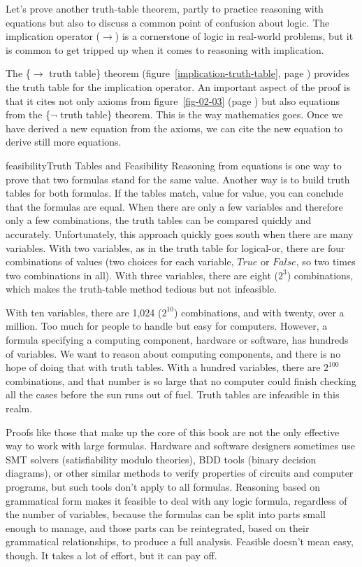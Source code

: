 Let's prove another truth-table theorem, partly to practice
reasoning with equations but also to discuss a common
point of confusion about logic. The implication operator
($\rightarrow$) is a cornerstone of logic in real-world problems,
but it is common to get tripped up when it comes to
reasoning with implication.

The \{$\rightarrow$ truth table\} theorem
(figure~\ref{implication-truth-table}, page \pageref{implication-truth-table})
provides the truth table
for the implication operator.
An important aspect of the proof is that it cites
not only axioms from figure~\ref{fig-02-03} (page \pageref{fig-02-03})
but also equations from the \{$\neg$ truth table\} theorem.
This is the way mathematics goes. Once we have derived
a new equation from the axioms, we can cite
the new equation to derive still more equations.

\begin{aside}{feasibility}{Truth Tables and Feasibility}
Reasoning from equations is one way to prove that two formulas stand
for the same value.
Another way is to build truth tables for both formulas.
If the tables match, value for value, you can conclude that
the formulas are equal.
When there are only a few variables and therefore only a few combinations,
the truth tables can be compared quickly and accurately.
Unfortunately, this approach quickly goes south when there are many variables.
With two variables, as in the truth table
for logical-or, there are four combinations of values
(two choices for each variable, $True$ or $False$, so two times two
combinations in all). With three variables, there are eight
($2^3$) combinations, which makes the truth-table method tedious
but not infeasible.

With ten variables, there are 1,024 ($2^{10}$) combinations,
and with twenty, over a million.
Too much for people to handle but easy for computers.
However, a formula specifying a computing component,
hardware or software, has hundreds of variables.
We want to reason about computing components,
and there is no hope of doing that with truth tables.
With a hundred variables, there are $2^{100}$ combinations,
and that number is so large that no computer could
finish checking all the cases before the sun runs out of fuel.
Truth tables are infeasible in this realm.

Proofs like those that make up the core of this book
are not the only effective way to work with large formulas.
Hardware and software designers sometimes use
SMT solvers (satisfiability modulo theories),
BDD tools (binary decision diagrams), or other similar methods
to verify properties of circuits and computer programs,
but such tools don't apply to all formulas.
Reasoning based on grammatical form
makes it feasible to deal with any logic formula,
regardless of the number of variables,
because the formulas can be split into parts small enough
to manage, and those parts can be reintegrated, based on
their grammatical relationships, to produce a full analysis.
Feasible doesn't mean easy, though.
It takes a lot of effort, but it can pay off.
\end{aside}

